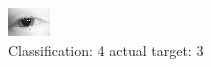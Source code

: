 \begin{figure}[h!]
\begin{center}
\includegraphics[width=0.60\columnwidth]{figures/ID113_class_4_target_3.png}
\end{center}
\caption{ Classification: 4 actual target: 3}
\label{fig:ID113_class_4_target_3}
\end{figure}
